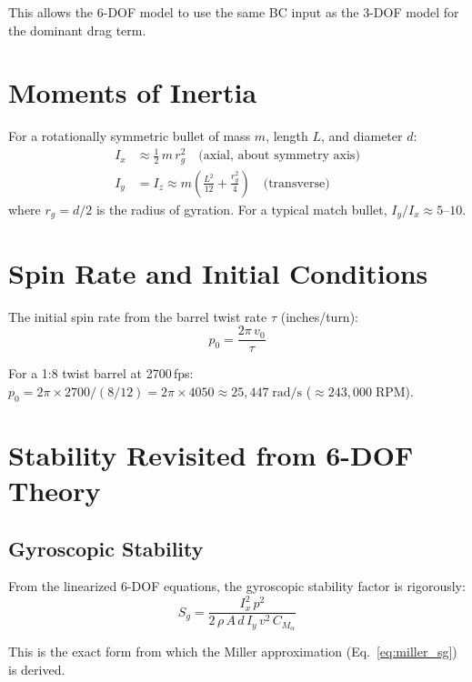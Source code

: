 \documentclass[11pt,twoside,openright]{report}
\begin{document}
This allows the 6-DOF model to use the same BC input as the 3-DOF model for the dominant drag term.

\section{Moments of Inertia}

For a rotationally symmetric bullet of mass $m$, length $L$, and diameter $d$:
\begin{align}
  I_x &\approx \frac{1}{2}\,m\,r_g^2 \quad \text{(axial, about symmetry axis)} \label{eq:Ix}\\
  I_y &= I_z \approx m\left(\frac{L^2}{12} + \frac{r_g^2}{4}\right) \quad \text{(transverse)} \label{eq:Iy}
\end{align}
where $r_g = d/2$ is the radius of gyration. For a typical match bullet, $I_y/I_x \approx 5$--$10$.

\section{Spin Rate and Initial Conditions}

The initial spin rate from the barrel twist rate $\tau$ (inches/turn):
\begin{equation}
  p_0 = \frac{2\pi\,v_0}{\tau}
  \label{eq:initial_spin}
\end{equation}

For a 1:8 twist barrel at 2700\,fps: $p_0 = 2\pi \times 2700/(8/12) = 2\pi \times 4050 \approx 25{,}447\;\text{rad/s}$ ($\approx 243{,}000\;\text{RPM}$).

\section{Stability Revisited from 6-DOF Theory}

\subsection{Gyroscopic Stability}

From the linearized 6-DOF equations, the gyroscopic stability factor is rigorously:
\begin{equation}
  S_g = \frac{I_x^2\,p^2}{2\,\rho\,A\,d\,I_y\,v^2\,C_{M_\alpha}}
  \label{eq:sg_6dof}
\end{equation}

This is the exact form from which the Miller approximation (Eq.~\ref{eq:miller_sg}) is derived.
\end{document}
